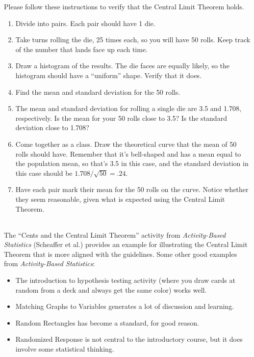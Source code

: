 \documentclass[twoside,openany]{tufte-book}
\begin{document}
Please follow these instructions to verify that the Central Limit Theorem holds.
\begin{enumerate}[leftmargin=1cm, itemsep=.2em]
\item Divide into pairs. Each pair should have 1 die. 
\item Take turns rolling the die, 25 times each, so you will have 50 rolls. Keep track of the number that lands face up each time.
\item Draw a histogram of the results. The die faces are equally likely, so the histogram should have a ``uniform'' shape. Verify that it does.
\item Find the mean and standard deviation for the 50 rolls.
\item The mean and standard deviation for rolling a single die are 3.5 and 1.708, respectively. Is the mean for your 50 rolls close to 3.5? Is the standard deviation close to 1.708?
\item Come together as a class. Draw the theoretical curve that the mean of 50 rolls should have. Remember that it's bell-shaped and has a mean equal to the population mean, so that's 3.5 in this case, and the standard deviation in this case should be $1.708/\sqrt{50} = .24$.
\item Have each pair mark their mean for the 50 rolls on the curve. Notice whether they seem reasonable, given what is expected using the Central Limit Theorem.
\end{enumerate}

\vspace{.25in}

\noindent{} \\ 
\vspace{.1in}
The ``Cents and the Central Limit Theorem'' activity from \textit{Activity-Based Statistics} (Scheaffer et al.) provides an example for illustrating the Central Limit Theorem that is more aligned with the guidelines. Some other good examples from \textit{Activity-Based Statistics}:
\begin{itemize}[leftmargin=1cm, itemsep=.2em]
\item The introduction to hypothesis testing activity (where you draw cards at random from a deck and always get the same color) works well.
\item Matching Graphs to Variables generates a lot of discussion and learning.
\item Random Rectangles has become a standard, for good reason.
\item Randomized Response is not central to the introductory course, but it does involve some statistical thinking.
\end{itemize}
\end{document}
